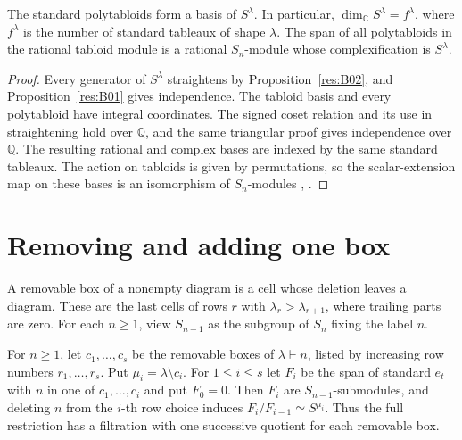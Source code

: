 \begin{theorem}\label{res:B03}
The standard polytabloids form a basis of \(S^\lambda\). In
particular, \(\dim_{\mathbb C} S^\lambda=f^\lambda\), where
\(f^\lambda\) is the number of standard tableaux of shape \(\lambda\).
The span of all polytabloids in the rational tabloid module is a
rational \(S_n\)-module whose complexification is \(S^\lambda\).
\end{theorem}

\begin{proof}
Every generator of \(S^\lambda\) straightens by
Proposition~\ref{res:B02}, and Proposition~\ref{res:B01} gives
independence. The tabloid basis and every polytabloid have integral
coordinates. The signed coset relation and its use in straightening
hold over \(\mathbb Q\), and the same triangular proof gives
independence over \(\mathbb Q\). The resulting rational and complex
bases are indexed by the same standard tableaux. The action on
tabloids is given by permutations, so the scalar-extension map on
these bases is an isomorphism of \(S_n\)-modules
\cite[Theorem 2.6.5]{sagan}, \cite[Corollary 4.38]{etingof}.
\end{proof}

\section{Removing and adding one box}

A removable box of a nonempty diagram is a cell whose deletion
leaves a diagram. These are the last cells of rows \(r\) with
\(\lambda_r>\lambda_{r+1}\), where trailing parts are zero. For each
\(n\ge 1\), view \(S_{n-1}\) as the subgroup of \(S_n\) fixing the
label \(n\).

\begin{proposition}\label{res:B04}
For \(n\ge 1\), let \(c_1,\ldots,c_s\) be the removable boxes of
\(\lambda\vdash n\), listed by increasing row numbers
\(r_1,\ldots,r_s\). Put
\(\mu_i=\lambda\setminus c_i\). For \(1\le i\le s\) let \(F_i\)
be the span of standard \(e_t\) with \(n\) in one of
\(c_1,\ldots,c_i\) and put \(F_0=0\). Then \(F_i\) are
\(S_{n-1}\)-submodules, and deleting \(n\) from the \(i\)-th row
choice induces \(F_i/F_{i-1}\simeq S^{\mu_i}\). Thus the full
restriction has a filtration with one successive quotient for
each removable box.
\end{proposition}

